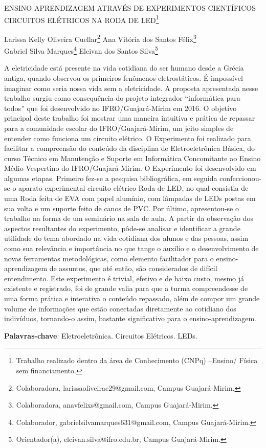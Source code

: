 \documentclass[article,12pt,onesidea,4paper,english,brazil]{abntex2}
\begin{document}
	
	
	\frenchspacing 
	
	\begin{center}
		\LARGE ENSINO APRENDIZAGEM ATRAVÉS DE EXPERIMENTOS CIENTÍFICOS
		CIRCUITOS ELÉTRICOS NA RODA DE LED\footnote{Trabalho realizado dentro da área de Conhecimento (CNPq) –Ensino/ Física sem financiamento.}
		
		\normalsize
		Larissa Kelly Oliveira Cuellar\footnote{Colaboradora, larissaoliveirac29@gmail.com, Campus Guajará-Mirim.} 
		Ana Vitória dos Santos Félix\footnote{Colaboradora, anavfelixs@gmail.com, Campus Guajará-Mirim.} \\
	Gabriel Silva Marques\footnote{Colaborador, gabrielsilvamarques631@gmail.com, Campus Guajará-Mirim.} 
		Elcivan dos Santos Silva\footnote{Orientador(a), elcivan.silva@ifro.edu.br, Campus Guajará-Mirim.} 
	\end{center}
	
	\noindent A eletricidade está presente na vida cotidiana do ser humano desde a Grécia antiga,
	quando observou os primeiros fenômenos eletrostáticos. É impossível imaginar
	como seria nossa vida sem a eletricidade. A proposta apresentada nesse trabalho
	surgiu como consequência do projeto integrador “informática para todos” que foi
	desenvolvido no IFRO/Guajará-Mirim em 2016. O objetivo principal deste trabalho foi
	mostrar uma maneira intuitiva e prática de repassar para a comunidade escolar do
	IFRO/Guajará-Mirim, um jeito simples de entender como funciona um circuito
	elétrico. O Experimento foi realizado para facilitar a compreensão do conteúdo da
	disciplina de Eletroeletrônica Básica, do curso Técnico em Manutenção e Suporte
	em Informática Concomitante ao Ensino Médio Vespertino do IFRO/Guajará-Mirim.
	O Experimento foi desenvolvido em algumas etapas. Primeiro fez-se a pesquisa
	bibliográfica, em seguida confeccionou-se o aparato experimental circuito elétrico
	Roda de LED, no qual consistia de uma Roda feita de EVA com papel alumínio, com
	lâmpadas de LEDs postas em sua volta e um suporte feito de canos de PVC. Por
	último, apresentou-se o trabalho na forma de um seminário na sala de aula. A partir
	da observação dos aspectos resultantes do experimento, pôde-se analisar e
	identificar a grande utilidade do tema abordado na vida cotidiana dos alunos e das
	pessoas, assim como sua relevância e importância no que tange o auxílio e o
	desenvolvimento de novas ferramentas metodológicas, como elemento facilitador
	para o ensino-aprendizagem de assuntos, que até então, são considerados de difícil
	entendimento. Este experimento é trivial, efetivo e de baixo custo, mesmo já
	existente e registrado, foi de grande valia para que a turma compreendesse de uma
	forma prática e interativa o conteúdo repassado, além de compor um grande volume
	de informações que estão conectadas diretamente ao cotidiano dos indivíduos,
	tornando-o assim, bastante significativo para o ensino-aprendizagem.
	
	\vspace{\onelineskip}
	
	\noindent
	\textbf{Palavras-chave}: Eletroeletrônica. Circuitos Elétricos. LEDs.
	
\end{document}
